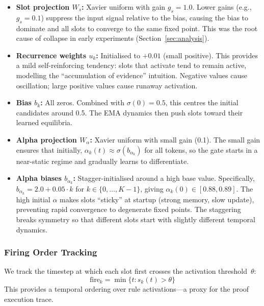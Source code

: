 \documentclass[conference]{IEEEtran}
\begin{document}
\begin{itemize}[nosep]
    \item \textbf{Slot projection $W_s$:} Xavier uniform with
          gain $g_s = 1.0$.  Lower gains (e.g., $g_s = 0.1$)
          suppress the input signal relative to the bias, causing
          the bias to dominate and all slots to converge to the
          same fixed point.  This was the root cause of collapse
          in early experiments (Section~\ref{sec:analysis}).
    \item \textbf{Recurrence weights $u_k$:} Initialised to
          $+0.01$ (small positive).  This provides a mild
          self-reinforcing tendency: slots that activate tend to
          remain active, modelling the ``accumulation of evidence''
          intuition.  Negative values cause oscillation; large
          positive values cause runaway activation.
    \item \textbf{Bias $b_k$:} All zeros.  Combined with
          $\sigma(0) = 0.5$, this centres the initial candidates
          around 0.5.  The EMA dynamics then push slots toward
          their learned equilibria.
    \item \textbf{Alpha projection $W_\alpha$:} Xavier uniform
          with small gain (0.1).  The small gain ensures that
          initially, $\alpha_k(t) \approx \sigma(b_{\alpha_k})$
          for all tokens, so the gate starts in a near-static
          regime and gradually learns to differentiate.
    \item \textbf{Alpha biases $b_{\alpha_k}$:} Stagger-initialised
          around a high base value.  Specifically,
          $b_{\alpha_k} = 2.0 + 0.05 \cdot k$ for
          $k \in \{0, \ldots, K{-}1\}$, giving
          $\alpha_k(0) \in [0.88, 0.89]$.  The high initial
          $\alpha$ makes slots ``sticky'' at startup (strong
          memory, slow update), preventing rapid convergence to
          degenerate fixed points.  The staggering breaks symmetry
          so that different slots start with slightly different
          temporal dynamics.
\end{itemize}

\subsubsection{Firing Order Tracking}

We track the timestep at which each slot first crosses the
activation threshold~$\theta$:
\begin{equation}
    \text{fire}_k = \min\{t : s_k(t) > \theta\}
\end{equation}
This provides a temporal ordering over rule activations---a proxy
for the proof execution trace.
\end{document}
